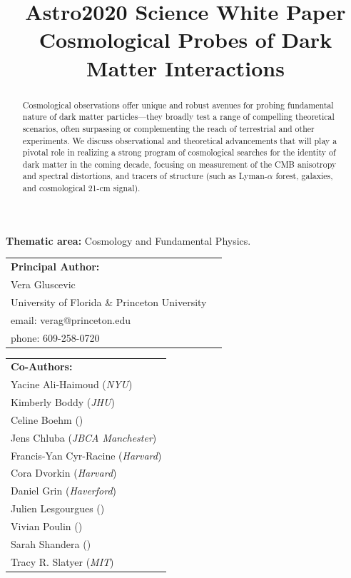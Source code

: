 \documentclass[12pt]{article}
\title{\textbf{Astro2020 Science White Paper}\\
\vspace{0.5cm}
Cosmological Probes of Dark Matter Interactions}
\date{}
\author{}
\begin{document}
\maketitle
\vspace{-2cm}
\begin{center}
\textbf{Thematic area:} Cosmology and Fundamental Physics.     
\end{center}
\vspace{0.5cm}

{\begin{tabular}{ll}
\textbf{Principal Author:} \\
Vera Gluscevic & \\
University of Florida \& Princeton University & \\
email: verag@princeton.edu\\
phone: 609-258-0720 & 
\end{tabular}

\vspace{0.5cm}
{\begin{tabular}{l}
\textbf{Co-Authors:}\\
Yacine Ali-Haimoud (\textit{NYU})\\
Kimberly Boddy (\textit{JHU})\\
Celine Boehm (\textit{})\\
Jens Chluba (\textit{JBCA Manchester})\\
Francis-Yan Cyr-Racine (\textit{Harvard})\\
Cora Dvorkin (\textit{Harvard})\\
Daniel Grin (\textit{Haverford})\\
Julien Lesgourgues (\textit{})\\
Vivian Poulin (\textit{})\\
Sarah Shandera (\textit{})\\
Tracy R. Slatyer (\textit{MIT})\\
\end{tabular}}
}
\vspace{7mm}



\begin{abstract}
Cosmological observations offer unique and robust avenues for probing fundamental nature of dark matter particles---they broadly test a range of compelling theoretical scenarios, often surpassing or complementing the reach of terrestrial and other experiments.
We discuss observational and theoretical advancements that will play a pivotal role in realizing a strong program of cosmological searches for the identity of dark matter in the coming decade, focusing on measurement of the CMB anisotropy and spectral distortions, and tracers of structure (such as Lyman-$\alpha$ forest, galaxies, and cosmological 21-cm signal).

\end{abstract}
\end{document}
